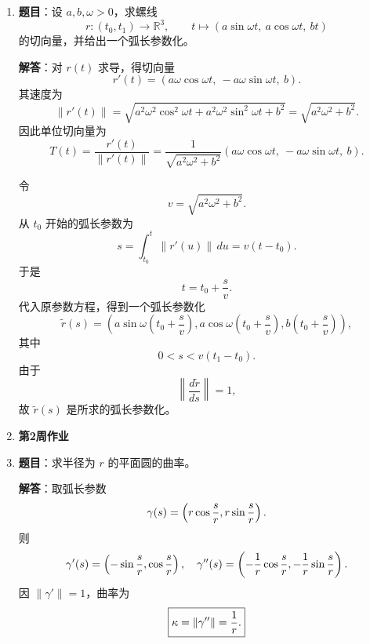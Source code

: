 \documentclass[UTF8,12pt,a4paper]{ctexart}
\newcommand{\norm}[1]{\left\lVert #1\right\rVert}
\newcommand{\homeworkweek}[1]{%
  \item[]\vspace{0.35em}\noindent\textbf{\large #1}\vspace{0.15em}
}
\begin{document}
\begin{enumerate}
\textbf{解答}：设 $r(t)$ 是 $C^1$ 正则曲线，即
\[
\|r'(t)\|_2>0,\qquad t\in(a,b).
\]
定义弧长函数
\[
\varphi(t)=c+\int_a^t \|r'(\tau)\|_2\,d\tau.
\]
由于 $\|r'(t)\|_2$ 连续且恒正，所以
\[
\varphi'(t)=\|r'(t)\|_2>0.
\]
因此 $\varphi(t)$ 在 $(a,b)$ 上严格单调递增，从而是一一对应。又由定义可知
\[
\varphi((a,b))=(c,d).
\]
所以对任意 $s\in(c,d)$，存在唯一 $t\in(a,b)$，使得
\[
\varphi(t)=s.
\]
记这个唯一的 $t$ 为
\[
t=\eta(s).
\]
于是
\[
s=c+\int_a^{\eta(s)} \|r'(\tau)\|_2\,d\tau,
\]
即
\[
\int_a^{\eta(s)} \|r'(\tau)\|_2\,d\tau=s-c.
\]
这说明 $\eta$ 定义合理。

又因为
\[
\varphi'(t)=\|r'(t)\|_2>0,
\]
由反函数定理可知，$\eta=\varphi^{-1}$ 是 $C^1$ 映射，并且
\[
\eta'(s)=\frac{1}{\varphi'(\eta(s))}
=\frac{1}{\|r'(\eta(s))\|_2}.
\]
若记 $t=\eta(s)$，则
\[
\eta'(s)=\frac{1}{\|r'(t)\|_2}.
\]

令弧长参数化为
\[
\widetilde r(s)=r(\eta(s)).
\]
则由链式法则，
\[
\widetilde r'(s)=r'(\eta(s))\eta'(s).
\]
因此
\[
\|\widetilde r'(s)\|_2
=
\|r'(\eta(s))\|_2\cdot |\eta'(s)|
=
\|r'(\eta(s))\|_2\cdot
\frac{1}{\|r'(\eta(s))\|_2}
=1.
\]
故 $\widetilde r(s)$ 是弧长参数化。

\item \textbf{题目}：设 $a,b,\omega>0$，求螺线
\[
r:(t_0,t_1)\to \mathbb R^3,\qquad
t\mapsto (a\sin\omega t,\ a\cos\omega t,\ bt)
\]
的切向量，并给出一个弧长参数化。

\textbf{解答}：对 $r(t)$ 求导，得切向量
\[
r'(t)=(a\omega\cos\omega t,\ -a\omega\sin\omega t,\ b).
\]
其速度为
\[
\|r'(t)\|
=
\sqrt{a^2\omega^2\cos^2\omega t+a^2\omega^2\sin^2\omega t+b^2}
=
\sqrt{a^2\omega^2+b^2}.
\]
因此单位切向量为
\[
T(t)=\frac{r'(t)}{\|r'(t)\|}
=
\frac{1}{\sqrt{a^2\omega^2+b^2}}
(a\omega\cos\omega t,\ -a\omega\sin\omega t,\ b).
\]

令
\[
v=\sqrt{a^2\omega^2+b^2}.
\]
从 $t_0$ 开始的弧长参数为
\[
s=\int_{t_0}^{t}\|r'(u)\|\,du
=v(t-t_0).
\]
于是
\[
t=t_0+\frac{s}{v}.
\]
代入原参数方程，得到一个弧长参数化
\[
\widetilde r(s)=
\left(
a\sin\omega\left(t_0+\frac{s}{v}\right),
a\cos\omega\left(t_0+\frac{s}{v}\right),
b\left(t_0+\frac{s}{v}\right)
\right),
\]
其中
\[
0<s<v(t_1-t_0).
\]
由于
\[
\left\|\frac{d\widetilde r}{ds}\right\|=1,
\]
故 $\widetilde r(s)$ 是所求的弧长参数化。

\homeworkweek{第2周作业}
\item \textbf{题目}：求半径为 $r$ 的平面圆的曲率。

\textbf{解答}：取弧长参数
\[
\gamma(s)=\left(r\cos{s\over r},r\sin{s\over r}\right).
\]
则
\[
\gamma'(s)=\left(-\sin{s\over r},\cos{s\over r}\right),\quad
\gamma''(s)=\left(-{1\over r}\cos{s\over r},-{1\over r}\sin{s\over r}\right).
\]
因 $\norm{\gamma'}=1$，曲率为
\[
\boxed{\kappa=\norm{\gamma''}={1\over r}.}
\]


\end{enumerate}
\end{document}
